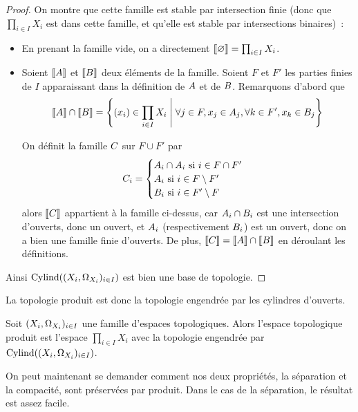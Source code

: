 \begin{proof}
  On montre que cette famille est stable par intersection finie (donc que
  $\displaystyle\prod_{i\in I} X_i$ est dans cette famille, et qu'elle est
  stable par intersections binaires)~:
  \begin{itemize}
  \item En prenant la famille vide, on a directement
    $\llbracket \varnothing\rrbracket = \prod_{i\in I} X_i$.
  \item Soient $\llbracket A\rrbracket$ et $\llbracket B\rrbracket$ deux éléments de la
    famille. Soient $F$ et $F'$ les parties finies de $I$ apparaissant dans la
    définition de $A$ et de $B$. Remarquons d'abord que
    \[\llbracket A\rrbracket \cap \llbracket B\rrbracket =
    \left\{ (x_i)\in \prod_{i \in I} X_i \;\middle\vert\;  \forall j \in F, x_j \in A_j,
      \forall k \in F', x_k \in B_j \right\}
    \]

    \noindent
    On définit la famille $C$ sur $F\cup F'$ par
    \[C_i =
    \begin{cases}
      A_i\cap A_i\text{ si } i\in F\cap F'\\
      A_i\text{ si } i \in F \setminus F'\\
      B_i\text{ si } i \in F'\setminus F
    \end{cases}\]
    alors $\llbracket C\rrbracket$ appartient à la famille ci-dessus, car
    $A_i\cap B_i$ est une intersection d'ouverts, donc un ouvert, et
    $A_i$ (respectivement $B_i$) est un ouvert, donc on a bien une
    famille finie d'ouverts. De plus,
    $\llbracket C\rrbracket = \llbracket A\rrbracket \cap \llbracket B\rrbracket$ en déroulant les
    définitions.
  \end{itemize}

  Ainsi $\operatorname{Cylind}((X_i,\Omega_{X_i})_{i\in I})$ est bien une base de topologie.
\end{proof}

\noindent
La topologie produit est donc la topologie engendrée par les cylindres
d'ouverts.

\begin{definition}
  Soit $(X_i,\Omega_{X_i})_{i\in I}$ une famille d'espaces topologiques. Alors
  l'espace topologique produit est l'espace $\displaystyle\prod_{i\in I} X_i$
  avec la topologie engendrée par $\operatorname{Cylind}((X_i,\Omega_{X_i})_{i\in I})$.
\end{definition}

On peut maintenant se demander comment nos deux propriétés, la séparation et la
compacité, sont préservées par produit. Dans le cas de la séparation, le
résultat est assez facile.

